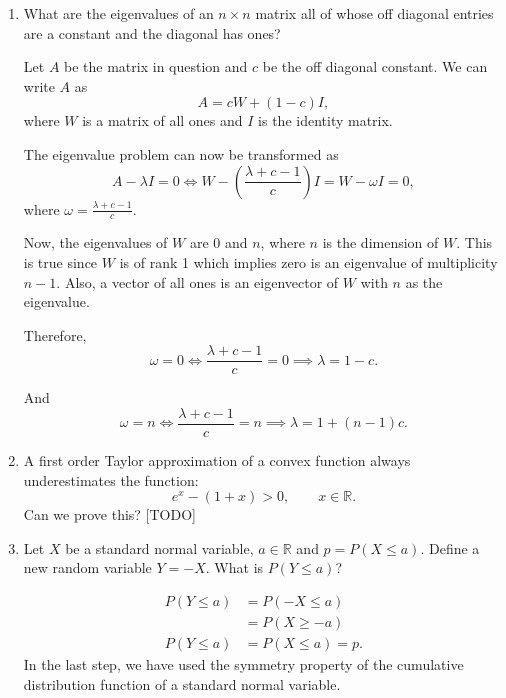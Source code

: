 \documentclass{amsart}
\theoremstyle{plain}
\numberwithin{equation}{section}
\begin{document}
\begin{enumerate}
\item What are the eigenvalues of an $n \times n$ 
matrix all of whose off diagonal entries are 
a constant and the diagonal has ones?

Let $A$ be the matrix in question and 
$c$ be the off diagonal constant. We can write
$A$ as
\begin{equation}
A = cW + (1-c) I,
\end{equation}
where $W$ is a matrix of all ones and 
$I$ is the identity matrix. 

The eigenvalue problem can now be transformed as
\begin{equation}
A - \lambda I = 0 
\iff
W - \left(\frac{\lambda + c - 1}{c}\right) I  
= W - \omega I = 0,
\end{equation}
where $\omega = \frac{\lambda + c - 1}{c}$.

Now, the eigenvalues of $W$ are $0$ and $n$, where
$n$ is the dimension of $W$. This is true 
since $W$ is of rank 1 which implies zero is an 
eigenvalue of multiplicity $n-1$. Also, a vector of all ones 
is an eigenvector of $W$ with $n$ as the eigenvalue. 

Therefore, 
\begin{equation}
\omega = 0 \iff
\frac{\lambda + c - 1}{c} = 0
\implies \lambda = 1 - c.
\end{equation}

And
\begin{equation}
\omega = n \iff
\frac{\lambda + c - 1}{c} = n
\implies \lambda = 1 + (n-1)c.
\end{equation}


\item A first order Taylor approximation of a 
convex function always underestimates the
function:
\begin{equation}
e^{x} - ( 1 + x ) > 0, \qquad  x \in \mathbb{R}.
\end{equation}
Can we prove this? [TODO]

\item Let $X$ be a standard normal variable,
$a \in \mathbb{R}$ and $p = P( X \leq a )$.
Define a new random variable $Y = -X$. What is 
$P( Y \leq a )$?

\begin{align}
P( Y \leq a ) &= P( -X \leq a )\\
&= P( X \geq -a )\\
P( Y \leq a ) &= P( X \leq a ) = p.
\end{align}
In the last step, we have used the symmetry property of 
the cumulative distribution function of a standard normal 
variable. 


\end{enumerate}
\end{document}
